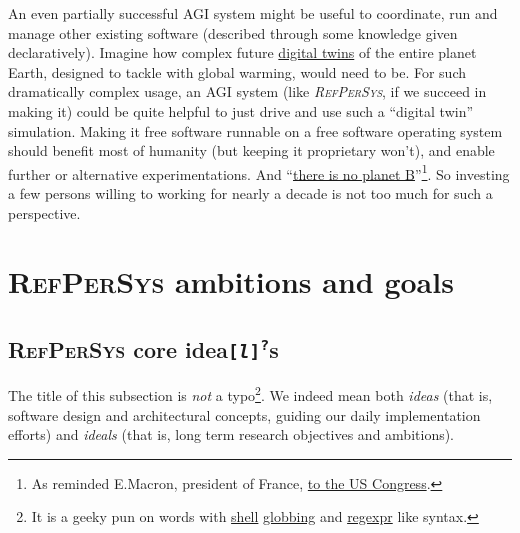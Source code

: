 \documentclass[11pt,a4paper,svgnames]{article}
\newcommand{\RefPerSys}{{\textit{\textsc{RefPerSys}}}}
\begin{document}
An even partially successful \textsc{AGI} system might be useful to
coordinate, run and manage other existing software (described through
some knowledge given declaratively). Imagine how complex future
\href{https://en.wikipedia.org/wiki/Digital_twin}{digital twins} of
the entire planet Earth, designed to tackle with global warming, would
need to be. For such dramatically complex usage, an AGI system (like
{\RefPerSys}, if we succeed in making it) could be quite helpful to
just drive and use such a ``digital twin'' simulation. Making it free
software runnable on a free software operating system should benefit
most of humanity (but keeping it proprietary won't), and enable
further or alternative experimentations. And
``\href{https://theresnoplanetb.net/}{there is no planet
  B}''\footnote{As reminded E.Macron, president of France,
  \href{https://www.bbc.com/news/av/world-us-canada-43900009/macron-to-us-congress-there-is-no-planet-b}{to
    the US Congress}.}. So investing a few persons willing to working
for nearly a decade is not too much for such a perspective.


\section{\textsc{RefPerSys} ambitions and goals}
\label{sec:ambitions-goals}


\subsection{\textsc{RefPerSys} core idea{\texttt{[\textit{l}]\textsuperscript{?}}}s}
\label{subsec:coreidea}

The title of this subsection is \emph{not} a typo\footnote{It is a
geeky pun on words with
\href{https://en.wikipedia.org/wiki/Unix_shell}{shell}
\href{https://en.wikipedia.org/wiki/Glob_(programming)}{globbing} and
\href{https://en.wikipedia.org/wiki/Regular\_expression}{regexpr} like
syntax.}. We indeed mean both \textit{ideas} (that is, software design
and architectural concepts, guiding our daily implementation efforts)
and \textit{ideals} (that is, long term research objectives and
ambitions).
\end{document}
